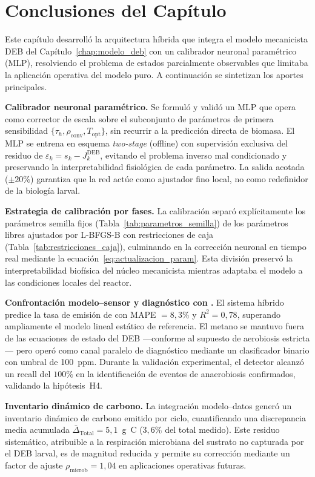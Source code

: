\section{Conclusiones del Capítulo}
\label{sec:cap4_conclusiones}

Este capítulo desarrolló la arquitectura híbrida que integra el modelo mecanicista DEB del Capítulo~\ref{chap:modelo_deb} con un calibrador neuronal paramétrico (MLP), resolviendo el problema de estados parcialmente observables que limitaba la aplicación operativa del modelo puro. A continuación se sintetizan los aportes principales.

\textbf{Calibrador neuronal paramétrico.} Se formuló y validó un MLP que opera como corrector de escala sobre el subconjunto de parámetros de primera sensibilidad $\{\tau_h, \rho_{\mathrm{conv}}, T_{\mathrm{opt}}\}$, sin recurrir a la predicción directa de biomasa. El MLP se entrena en esquema \emph{two-stage} (offline) con supervisión exclusiva del residuo de  $\varepsilon_k = s_k - J_k^{\mathrm{DEB}}$, evitando el problema inverso mal condicionado y preservando la interpretabilidad fisiológica de cada parámetro. La salida acotada ($\pm 20\%$) garantiza que la red actúe como ajustador fino local, no como redefinidor de la biología larval.

\textbf{Estrategia de calibración por fases.} La calibración separó explícitamente los parámetros semilla fijos (Tabla~\ref{tab:parametros_semilla}) de los parámetros libres ajustados por L-BFGS-B con restricciones de caja (Tabla~\ref{tab:restricciones_caja}), culminando en la corrección neuronal en tiempo real mediante la ecuación~\eqref{eq:actualizacion_param}. Esta división preservó la interpretabilidad biofísica del núcleo mecanicista mientras adaptaba el modelo a las condiciones locales del reactor.

\textbf{Confrontación modelo--sensor y diagnóstico con .} El sistema híbrido predice la tasa de emisión de  con MAPE $= 8{,}3\%$ y $R^2 = 0{,}78$, superando ampliamente el modelo lineal estático de referencia. El metano se mantuvo fuera de las ecuaciones de estado del DEB ---conforme al supuesto de aerobiosis estricta--- pero operó como canal paralelo de diagnóstico mediante un clasificador binario con umbral de \SI{100}{ppm}. Durante la validación experimental, el detector alcanzó un recall del $100\%$ en la identificación de eventos de anaerobiosis confirmados, validando la hipótesis~H4.

\textbf{Inventario dinámico de carbono.} La integración modelo--datos generó un inventario dinámico de carbono emitido por ciclo, cuantificando una discrepancia media acumulada $\bar{\Delta}_{\mathrm{Total}} = 5{,}1$~g~C ($3{,}6\%$ del total medido). Este residuo sistemático, atribuible a la respiración microbiana del sustrato no capturada por el DEB larval, es de magnitud reducida y permite su corrección mediante un factor de ajuste $\rho_{\mathrm{microb}} = 1{,}04$ en aplicaciones operativas futuras.

